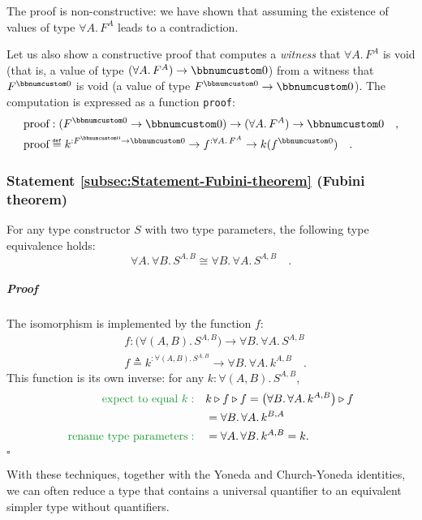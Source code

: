 The proof is non-constructive: we have shown that assuming the existence
of values of type $\forall A.\,F^{A}$ leads to a contradiction. 

Let us also show a constructive proof that computes a \emph{witness}
that $\forall A.\,F^{A}$ is void (that is, a value of type $(\forall A.\,F^{A})\rightarrow\bbnum 0$)
from a witness that $F^{\bbnum 0}$ is void (a value of type $F^{\bbnum 0}\rightarrow\bbnum 0$).
The computation is expressed as a function \lstinline!proof!:
\begin{align*}
 & \text{proof}:(F^{\bbnum 0}\rightarrow\bbnum 0)\rightarrow(\forall A.\,F^{A})\rightarrow\bbnum 0\quad,\\
 & \text{proof}\triangleq k^{:F^{\bbnum 0}\rightarrow\bbnum 0}\rightarrow f^{:\forall A.\,F^{A}}\rightarrow k(f^{\bbnum 0})\quad.
\end{align*}


\subsubsection{Statement \label{subsec:Statement-Fubini-theorem}\ref{subsec:Statement-Fubini-theorem}
(Fubini theorem)}

For any type constructor $S$ with two type parameters, the following
type equivalence holds:
\[
\forall A.\,\forall B.\,S^{A,B}\cong\forall B.\,\forall A.\,S^{A,B}\quad.
\]


\subparagraph{Proof}

The isomorphism is implemented by the function $f$:
\begin{align*}
 & f:\big(\forall(A,B).\,S^{A,B}\big)\rightarrow\forall B.\,\forall A.\,S^{A,B}\\
 & f\triangleq k^{:\forall(A,B).\,S^{A,B}}\rightarrow\forall B.\,\forall A.\,k^{A,B}\quad.
\end{align*}
This function is its own inverse: for any $k:\forall(A,B).\,S^{A,B}$,
\begin{align*}
{\color{greenunder}\text{expect to equal }k:}\quad & k\triangleright f\triangleright f=\big(\forall B.\,\forall A.\,k^{A,B}\big)\triangleright f\\
 & =\forall B.\,\forall A.\,k^{B,A}\\
{\color{greenunder}\text{rename type parameters}:}\quad & =\forall A.\,\forall B.\,k^{A,B}=k.
\end{align*}
$\square$ 

With these techniques, together with the Yoneda and Church-Yoneda
identities, we can often reduce a type that contains a universal quantifier
to an equivalent simpler type without quantifiers.


